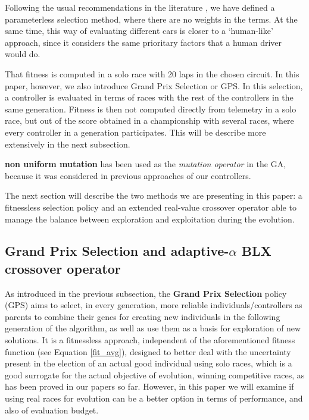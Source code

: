 \documentclass[10pt,journal,compsoc]{IEEEtran}
\begin{document}
Following the usual recommendations in the literature
\cite{Harik-ParameterLess99}, we have defined a parameterless
selection method, where there are no weights in the terms.
At the same time, this way of evaluating different cars is closer to a `human-like'
approach, since it considers the same prioritary factors that a human
driver would do.

That fitness is computed in a solo race with 20 laps in the chosen circuit. In this paper, however, we also introduce Grand Prix Selection or GPS. In this
selection, a controller is evaluated in terms of races with the rest
of the controllers in the same generation. Fitness is then not
computed directly from telemetry in a solo race, but out of the score
obtained in a championship with several races, where every controller
in a generation participates. This will be describe more extensively
in the next subsection.

\textbf{non uniform mutation} \cite{mutation1997} has been used as the
\textit{mutation operator} in the GA, because it was considered in
previous approaches of our controllers. 

The next section will describe the two methods we are presenting in
this paper: a fitnessless selection policy and an extended real-value
crossover operator able to manage the balance between exploration and
exploitation during the evolution. 

\subsection{Grand Prix Selection and adaptive-$\alpha$ BLX crossover operator}
\label{subsec:novel_operators}



As introduced in the previous subsection, the \textbf{Grand Prix Selection} policy (GPS)  aims to select, in every generation, more reliable individuals/controllers as parents to combine their genes for creating new individuals in the following generation of the algorithm, as well as use them as a basis for exploration of new solutions. It is a fitnessless approach,
independent of the aforementioned fitness function (see Equation
\ref{fit_avg}), designed to better deal with the uncertainty present
in the election of an actual good individual using solo races, which
is a good surrogate for the actual objective of evolution, winning
competitive races, as has been proved in our papers so far. However,
in this paper we will examine if using real races for evolution can be
a better option in terms of performance, and also of evaluation
budget. 
\end{document}
